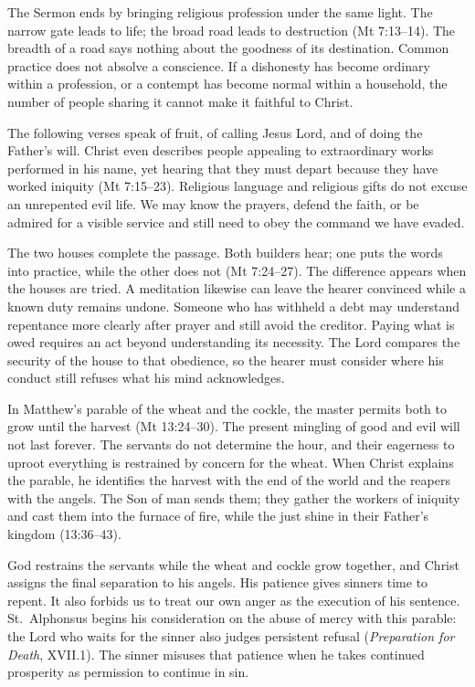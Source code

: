 The Sermon ends by bringing religious profession under the same light. The narrow gate leads to life; the broad road leads to destruction (Mt 7:13--14). The breadth of a road says nothing about the goodness of its destination. Common practice does not absolve a conscience. If a dishonesty has become ordinary within a profession, or a contempt has become normal within a household, the number of people sharing it cannot make it faithful to Christ.

The following verses speak of fruit, of calling Jesus Lord, and of doing the Father's will. Christ even describes people appealing to extraordinary works performed in his name, yet hearing that they must depart because they have worked iniquity (Mt 7:15--23). Religious language and religious gifts do not excuse an unrepented evil life. We may know the prayers, defend the faith, or be admired for a visible service and still need to obey the command we have evaded.

The two houses complete the passage. Both builders hear; one puts the words into practice, while the other does not (Mt 7:24--27). The difference appears when the houses are tried. A meditation likewise can leave the hearer convinced while a known duty remains undone. Someone who has withheld a debt may understand repentance more clearly after prayer and still avoid the creditor. Paying what is owed requires an act beyond understanding its necessity. The Lord compares the security of the house to that obedience, so the hearer must consider where his conduct still refuses what his mind acknowledges.

In Matthew's parable of the wheat and the cockle, the master permits both to grow until the harvest (Mt 13:24--30). The present mingling of good and evil will not last forever. The servants do not determine the hour, and their eagerness to uproot everything is restrained by concern for the wheat. When Christ explains the parable, he identifies the harvest with the end of the world and the reapers with the angels. The Son of man sends them; they gather the workers of iniquity and cast them into the furnace of fire, while the just shine in their Father's kingdom (13:36--43).

God restrains the servants while the wheat and cockle grow together, and Christ assigns the final separation to his angels. His patience gives sinners time to repent. It also forbids us to treat our own anger as the execution of his sentence. St.~Alphonsus begins his consideration on the abuse of mercy with this parable: the Lord who waits for the sinner also judges persistent refusal (\emph{Preparation for Death}, XVII.1). The sinner misuses that patience when he takes continued prosperity as permission to continue in sin.


